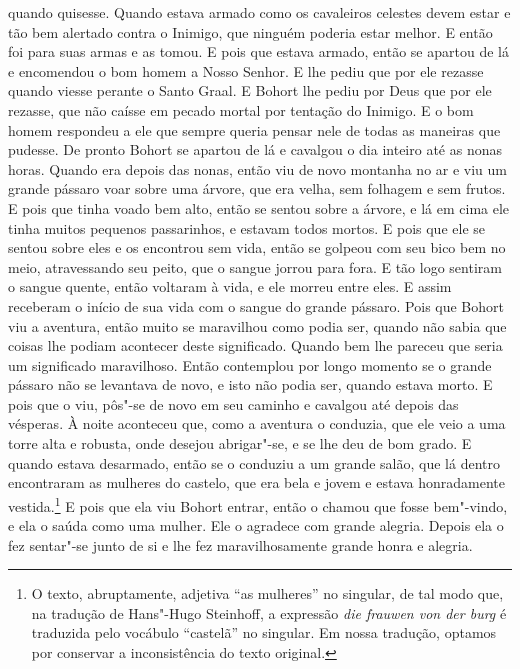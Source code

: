 quando quisesse. Quando estava armado como os cavaleiros celestes devem estar e
tão bem alertado contra o Inimigo, que ninguém poderia estar melhor. E então
foi para suas armas e as tomou. E pois que estava armado, então se apartou de
lá e encomendou o bom homem a Nosso Senhor. E lhe pediu que por ele rezasse
quando viesse perante o Santo Graal. E Bohort lhe pediu por Deus que por ele
rezasse, que não caísse em pecado mortal por tentação do Inimigo. E o bom homem
respondeu a ele que sempre queria pensar nele de todas as maneiras que pudesse.
De pronto Bohort se apartou de lá e cavalgou o dia inteiro até as nonas horas.
Quando era depois das nonas, então viu de novo montanha no ar e viu um grande
pássaro voar sobre uma árvore, que era velha, sem folhagem e sem frutos. E pois
que tinha voado bem alto, então se sentou sobre a árvore, e lá em cima ele
tinha muitos pequenos passarinhos, e estavam todos mortos. E pois que ele se
sentou sobre eles e os encontrou sem vida, então se golpeou com seu bico bem no
meio, atravessando seu peito, que o sangue jorrou para fora. E tão logo
sentiram o sangue quente, então voltaram à vida, e ele morreu entre eles. E
assim receberam o início de sua vida com o sangue do grande pássaro.
Pois que Bohort viu a aventura, então muito se maravilhou como podia ser,
quando não sabia que coisas lhe podiam acontecer deste significado. Quando bem
lhe pareceu que seria um significado maravilhoso. Então contemplou por longo
momento se o grande pássaro não se levantava de novo, e isto não podia ser,
quando estava morto. E pois que o viu, pôs"-se de novo em seu caminho e cavalgou
até depois das vésperas. À noite aconteceu que, como a aventura o conduzia, que
ele veio a uma torre alta e robusta, onde desejou abrigar"-se, e se lhe deu de
bom grado. E quando estava desarmado, então se o conduziu a um grande salão,
que lá dentro encontraram as mulheres do castelo, que era bela e jovem e estava
honradamente vestida.\footnote{ O texto, abruptamente, adjetiva
“as mulheres” no singular, de tal modo que, na tradução de Hans"-Hugo Steinhoff,
a expressão \textit{die frauwen von der burg}  é
traduzida pelo vocábulo “castelã” no singular. Em nossa
tradução, optamos por conservar a inconsistência do texto original.} E
pois que ela viu Bohort entrar, então o chamou que fosse bem"-vindo, e ela o
saúda como uma mulher. Ele o agradece com grande alegria. Depois ela o fez
sentar"-se junto de si e lhe fez maravilhosamente grande honra e alegria.

